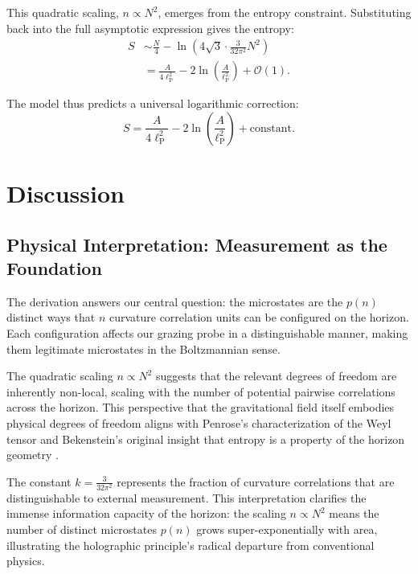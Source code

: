 \documentclass[12pt, letterpaper]{article}
\newcommand{\ellp}{\ell_{\mathrm{P}}}
\begin{document}
This quadratic scaling, $n \propto N^2$, emerges from the entropy constraint. Substituting back into the full asymptotic expression gives the entropy:
\begin{align}
S &\sim \frac{N}{4} - \ln\left(4 \sqrt{3} \cdot \frac{3}{32\pi^2} N^2 \right) \\
&= \frac{A}{4\ellp^2} - 2 \ln\left( \frac{A}{\ellp^2} \right) + \mathcal{O}(1).
\end{align}

The model thus predicts a universal logarithmic correction:
\begin{equation}\label{eq:final_entropy}
S = \frac{A}{4\ellp^2} - 2 \ln\left( \frac{A}{\ellp^2} \right) + \text{constant}.
\end{equation}

\section{Discussion}

\subsection{Physical Interpretation: Measurement as the Foundation}

The derivation answers our central question: the microstates are the $p(n)$ distinct ways that $n$ curvature correlation units can be configured on the horizon. Each configuration affects our grazing probe in a distinguishable manner, making them legitimate microstates in the Boltzmannian sense.

The quadratic scaling $n \propto N^2$ suggests that the relevant degrees of freedom are inherently non-local, scaling with the number of potential pairwise correlations across the horizon. This perspective that the gravitational field itself embodies physical degrees of freedom aligns with Penrose's characterization of the Weyl tensor \cite{Penrose2004} and Bekenstein's original insight that entropy is a property of the horizon geometry \cite{Bekenstein1972}.

The constant $k = \frac{3}{32\pi^2}$ represents the fraction of curvature correlations that are distinguishable to external measurement. This interpretation clarifies the immense information capacity of the horizon: the scaling $n \propto N^2$ means the number of distinct microstates $p(n)$ grows super-exponentially with area, illustrating the holographic principle's radical departure from conventional physics.
\end{document}
